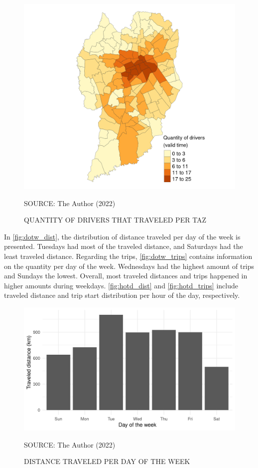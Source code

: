 \begin{figure}
    \centering\footnotesize
    \captionsetup{font=footnotesize}
    \caption{QUANTITY OF DRIVERS THAT TRAVELED PER TAZ}
    \includegraphics{fig/taz_drivers.png}
    \label{fig:taz_drivers}
    \par SOURCE: The Author (2022)
\end{figure}

In \autoref{fig:dotw_dist}, the distribution of distance traveled per day of the week is presented. Tuesdays had most of the traveled distance, and Saturdays had the least traveled distance. Regarding the trips, \autoref{fig:dotw_trips} contains information on the quantity per day of the week. Wednesdays had the highest amount of trips and Sundays the lowest. Overall, most traveled distances and trips happened in higher amounts during weekdays. \autoref{fig:hotd_dist} and \autoref{fig:hotd_trips} include traveled distance and trip start distribution per hour of the day, respectively.  

\begin{figure}[!htbp]
    \centering\footnotesize
    \captionsetup{font=footnotesize}
    \caption{DISTANCE TRAVELED PER DAY OF THE WEEK}
    \includegraphics{fig/dotw_dist.png}
    \label{fig:dotw_dist}
    \par SOURCE: The Author (2022)
\end{figure}

